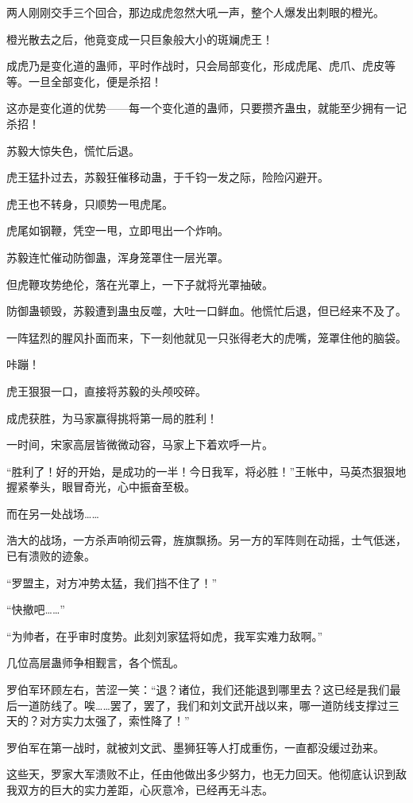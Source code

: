 \begin{this_body}
两人刚刚交手三个回合，那边成虎忽然大吼一声，整个人爆发出刺眼的橙光。

橙光散去之后，他竟变成一只巨象般大小的斑斓虎王！

成虎乃是变化道的蛊师，平时作战时，只会局部变化，形成虎尾、虎爪、虎皮等等。一旦全部变化，便是杀招！

这亦是变化道的优势——每一个变化道的蛊师，只要攒齐蛊虫，就能至少拥有一记杀招！

苏毅大惊失色，慌忙后退。

虎王猛扑过去，苏毅狂催移动蛊，于千钧一发之际，险险闪避开。

虎王也不转身，只顺势一甩虎尾。

虎尾如钢鞭，凭空一甩，立即甩出一个炸响。

苏毅连忙催动防御蛊，浑身笼罩住一层光罩。

但虎鞭攻势绝伦，落在光罩上，一下子就将光罩抽破。

防御蛊顿毁，苏毅遭到蛊虫反噬，大吐一口鲜血。他慌忙后退，但已经来不及了。

一阵猛烈的腥风扑面而来，下一刻他就见一只张得老大的虎嘴，笼罩住他的脑袋。

咔蹦！

虎王狠狠一口，直接将苏毅的头颅咬碎。

成虎获胜，为马家赢得挑将第一局的胜利！

一时间，宋家高层皆微微动容，马家上下着欢呼一片。

“胜利了！好的开始，是成功的一半！今日我军，将必胜！”王帐中，马英杰狠狠地握紧拳头，眼冒奇光，心中振奋至极。

而在另一处战场……

浩大的战场，一方杀声响彻云霄，旌旗飘扬。另一方的军阵则在动摇，士气低迷，已有溃败的迹象。

“罗盟主，对方冲势太猛，我们挡不住了！”

“快撤吧……”

“为帅者，在乎审时度势。此刻刘家猛将如虎，我军实难力敌啊。”

几位高层蛊师争相觐言，各个慌乱。

罗伯军环顾左右，苦涩一笑：“退？诸位，我们还能退到哪里去？这已经是我们最后一道防线了。唉……罢了，罢了，我们和刘文武开战以来，哪一道防线支撑过三天的？对方实力太强了，索性降了！”

罗伯军在第一战时，就被刘文武、墨狮狂等人打成重伤，一直都没缓过劲来。

这些天，罗家大军溃败不止，任由他做出多少努力，也无力回天。他彻底认识到敌我双方的巨大的实力差距，心灰意冷，已经再无斗志。


\end{this_body}
